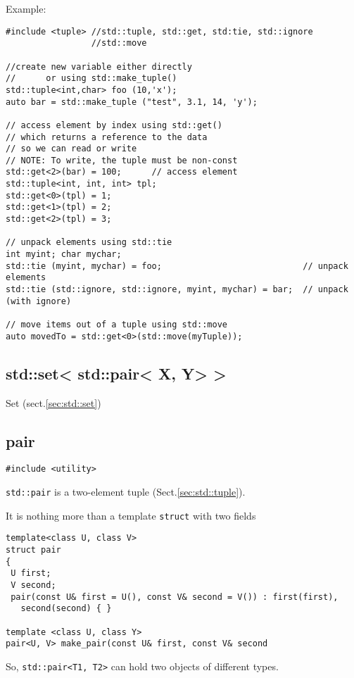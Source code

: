 Example:
\begin{lstlisting}
#include <tuple> //std::tuple, std::get, std:tie, std::ignore
                 //std::move

//create new variable either directly 
//      or using std::make_tuple()
std::tuple<int,char> foo (10,'x');
auto bar = std::make_tuple ("test", 3.1, 14, 'y');

// access element by index using std::get()
// which returns a reference to the data
// so we can read or write
// NOTE: To write, the tuple must be non-const
std::get<2>(bar) = 100;      // access element
std::tuple<int, int, int> tpl;
std::get<0>(tpl) = 1;
std::get<1>(tpl) = 2;
std::get<2>(tpl) = 3;

// unpack elements using std::tie
int myint; char mychar;
std::tie (myint, mychar) = foo;                            // unpack elements
std::tie (std::ignore, std::ignore, myint, mychar) = bar;  // unpack (with ignore)

// move items out of a tuple using std::move
auto movedTo = std::get<0>(std::move(myTuple));

\end{lstlisting}

\subsection{std::set< std::pair< X, Y> > }
\label{sec:set_pairs}

Set (sect.\ref{sec:std::set})

\subsection{pair}
\label{sec:std::pair}

\begin{verbatim}
#include <utility>
\end{verbatim}

\verb!std::pair! is a two-element tuple (Sect.\ref{sec:std::tuple}).

It is nothing more than a template
\verb!struct! with two fields
\begin{verbatim}
template<class U, class V>
struct pair
{
 U first;
 V second;
 pair(const U& first = U(), const V& second = V()) : first(first),
   second(second) { }

template <class U, class Y>
pair<U, V> make_pair(const U& first, const V& second
\end{verbatim}

So, \verb!std::pair<T1, T2>! can hold two objects of different types.

